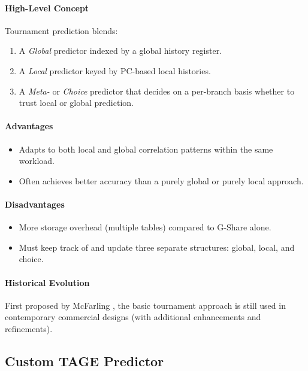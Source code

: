\documentclass[11pt]{article}
\begin{document}
\paragraph{High-Level Concept}
Tournament prediction \cite{mcfarling1993combining} blends:
\begin{enumerate}
    \item A \emph{Global} predictor indexed by a global history register.
    \item A \emph{Local} predictor keyed by PC-based local histories.
    \item A \emph{Meta-} or \emph{Choice} predictor that decides on a per-branch basis whether to trust local or global prediction.
\end{enumerate}

\paragraph{Advantages}
\begin{itemize}
    \item Adapts to both local and global correlation patterns within the same workload.
    \item Often achieves better accuracy than a purely global or purely local approach.
\end{itemize}

\paragraph{Disadvantages}
\begin{itemize}
    \item More storage overhead (multiple tables) compared to G-Share alone.
    \item Must keep track of and update three separate structures: global, local, and choice.
\end{itemize}

\paragraph{Historical Evolution}
First proposed by McFarling \cite{mcfarling1993combining}, the basic tournament approach is still used in contemporary commercial designs (with additional enhancements and refinements).

\subsection{Custom TAGE Predictor}
\end{document}
